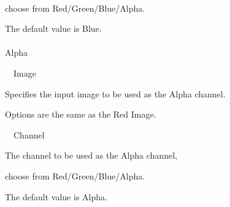 \documentclass[a4paper,12pt]{article}
\begin{document}
\newpage

\thispagestyle{empty}

\ \vspace{-0.2em}
\par
choose from Red/Green/Blue/Alpha.\par
The default value is Blue.\\
\\
Alpha\par
\noindent \ \, Image\par
Specifies the input image to be used as the Alpha channel.\par
Options are the same as the \textquotedbl Red Image\textquotedbl .\\
\par
\noindent \ \, Channel\par
The channel to be used as the Alpha channel,\par
choose from Red/Green/Blue/Alpha.\par
The default value is Alpha.
\end{document}
